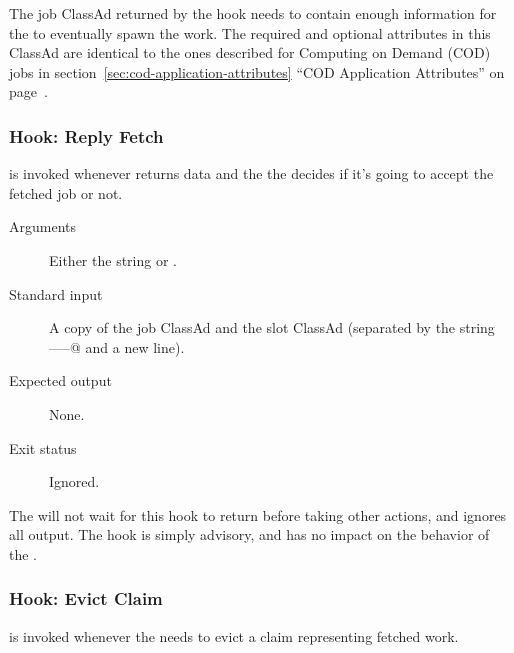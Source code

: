 The job ClassAd returned by the hook needs to contain enough
information for the  to eventually spawn the work.
The required and optional attributes in this ClassAd are identical to
the ones described for Computing on Demand (COD) jobs in
section~\ref{sec:cod-application-attributes} 
``COD Application Attributes'' on
page~\pageref{sec:cod-application-attributes}.


\subsubsection{\label{sec:job-hooks-reply-fetch}
Hook: Reply Fetch}

 is invoked whenever
 returns data and the the 
decides if it's going to accept the fetched job or not.

\begin{description}
\item[Arguments]
  Either the string \verb@accept@ or \verb@reject@.

\item[Standard input]
  A copy of the job ClassAd and the slot ClassAd
  (separated by the string \verb@-----@ and a new line).

\item[Expected output]
  None.

\item[Exit status]
  Ignored.
\end{description}

The  will not wait for this hook to return before
taking other actions, and ignores all output.
The hook is simply advisory, and has no impact on the behavior of the
.


\subsubsection{\label{sec:job-hooks-evict-claim}
Hook: Evict Claim}

 is invoked whenever the 
needs to evict a claim representing fetched work.

